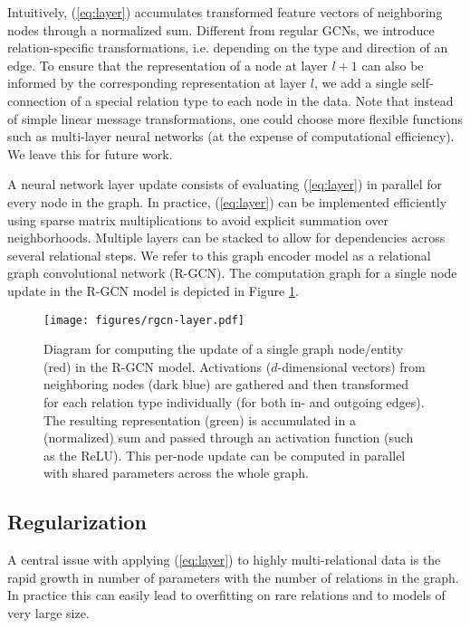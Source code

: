 \documentclass[letterpaper]{article} \usepackage{aaai18}  \usepackage{times}  \usepackage{helvet}  \usepackage{courier}  \usepackage{url}  \usepackage{graphicx}  \frenchspacing
\begin{document}
Intuitively, (\ref{eq:layer}) accumulates transformed feature vectors of neighboring nodes through a normalized sum. Different from regular GCNs, we introduce relation-specific transformations, i.e. depending on the type and direction of an edge.
To ensure that the representation of a node at layer $l+1$ can also be informed by the corresponding representation at layer $l$, we add a single self-connection of a special relation type to each node in the data. Note that instead of simple linear message transformations, one could choose more flexible functions such as multi-layer neural networks (at the expense of computational efficiency). We leave this for future work.

A neural network layer update consists of evaluating (\ref{eq:layer}) in parallel for every node in the graph. In practice, (\ref{eq:layer}) can be implemented efficiently using sparse matrix multiplications to avoid explicit summation over neighborhoods. Multiple layers can be stacked to allow for dependencies across several relational steps. We refer to this graph encoder model as a relational graph convolutional network (R-GCN). The computation graph for a single node update in the R-GCN model is depicted in Figure \ref{fig:model}.

\begin{figure}[t!]
        \centering
    \texttt{[image: figures/rgcn-layer.pdf]}
    \label{fig:model-a}
    \caption{Diagram for computing the update of a single graph node/entity (red) in the R-GCN model. Activations ($d$-dimensional  vectors) from neighboring nodes (dark blue) are gathered and then transformed for each relation type individually (for both in- and outgoing edges). The resulting representation (green) is accumulated in a (normalized) sum and passed through an activation function (such as the ReLU). This per-node update can be computed in parallel with shared parameters across the whole graph.}
    \label{fig:model}
\end{figure}

\subsection{Regularization}
A central issue with applying (\ref{eq:layer}) to highly multi-relational data is the rapid growth in number of parameters with the number of relations in the graph. In practice this can easily lead to overfitting on rare relations and to models of very large size.
\end{document}
